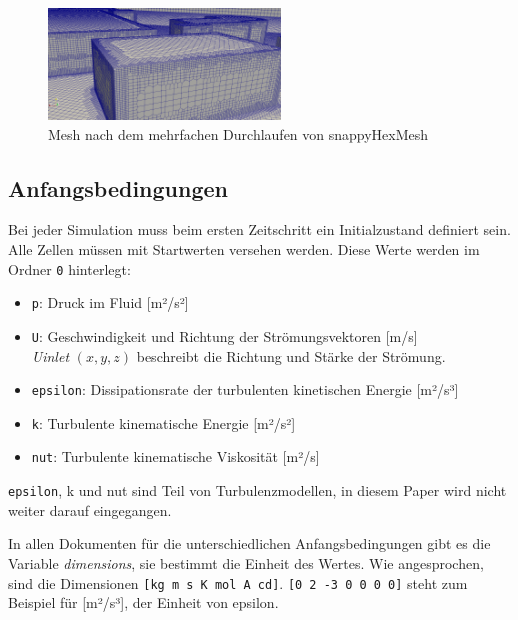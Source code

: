 \begin{figure}
    \centering
    \includegraphics[width=0.55\textwidth]{papers/openfoam/Bilder/Snappy_fein.png}
    \caption{Mesh nach dem mehrfachen Durchlaufen von snappyHexMesh}
    \label{fig:snappyfeinbild}
\end{figure}

\subsection{Anfangsbedingungen \label{openfoam:section:Anfangsbedingungen}}
Bei jeder Simulation muss beim ersten Zeitschritt ein Initialzustand definiert sein.
Alle Zellen müssen mit Startwerten versehen werden. 
Diese Werte werden im Ordner \texttt{0} hinterlegt:
\begin{itemize}
    \item \texttt{p}: Druck im Fluid [m²/s²]
    \item \texttt{U}: Geschwindigkeit und Richtung der Strömungsvektoren [m/s]\\
    \textit{Uinlet} $ (x, y, z) $ beschreibt die Richtung und Stärke der Strömung. 
    \item \texttt{epsilon}: Dissipationsrate der turbulenten kinetischen Energie [m²/s³]
    \item \texttt{k}: Turbulente kinematische Energie [m²/s²]
    \item \texttt{nut}: Turbulente kinematische Viskosität [m²/s]
\end{itemize}
\texttt{epsilon}, k und nut sind Teil von Turbulenzmodellen, in diesem Paper wird nicht weiter darauf eingegangen.

In allen Dokumenten für die unterschiedlichen Anfangsbedingungen gibt es die Variable \textit{dimensions}, sie bestimmt die Einheit des Wertes.
Wie angesprochen, sind die Dimensionen \texttt{[kg m s K mol A cd]}.
\texttt{[0 2 -3 0 0 0 0]} steht zum Beispiel für [m²/s³], der Einheit von epsilon.

